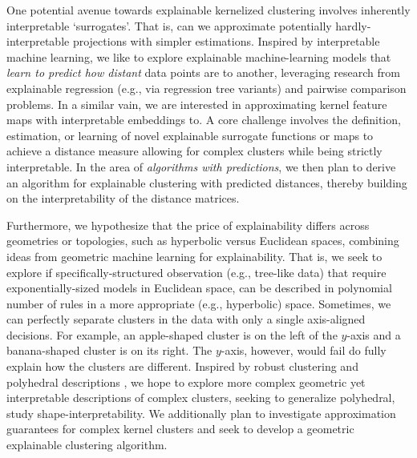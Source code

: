 \documentclass[a4paper,11pt]{article}
\begin{document}
One potential avenue towards explainable kernelized clustering involves inherently interpretable `surrogates'.
That is, can we approximate potentially hardly-interpretable projections with simpler estimations.
Inspired by interpretable machine learning, we like to explore explainable machine-learning models that \emph{learn to predict how distant} data points are to another, leveraging research from explainable regression (e.g., via regression tree variants) and pairwise comparison problems.
In a similar vain, we are interested in approximating kernel feature maps with interpretable embeddings to. 
A core challenge involves the definition, estimation, or learning of novel explainable surrogate functions or maps to achieve a distance measure allowing for complex clusters while being strictly interpretable.
In the area of \emph{algorithms with predictions}, we then plan to derive an algorithm for explainable clustering with predicted distances, thereby building on the interpretability of the distance matrices.

Furthermore, we hypothesize that the price of explainability differs across geometries or topologies, such as hyperbolic versus Euclidean spaces, combining ideas from geometric machine learning for explainability. 
That is, we seek to explore if specifically-structured observation (e.g., tree-like data) that require exponentially-sized models in Euclidean space, can be described in polynomial number of rules in a more appropriate (e.g., hyperbolic) space.
Sometimes, we can perfectly separate clusters in the data with only a single axis-aligned decisions.
For example, an apple-shaped cluster is on the left of the $y$-axis and a banana-shaped cluster is on its right. 
The $y$-axis, however, would fail do fully explain how the clusters are different.
Inspired by robust clustering and polyhedral descriptions \cite{lawless2023polyhedral},
we hope to explore more complex geometric yet interpretable descriptions of complex clusters, seeking to generalize polyhedral, study shape-interpretability. 
We additionally plan to investigate approximation guarantees for complex kernel clusters and seek to develop a geometric explainable clustering algorithm.

\end{document}

